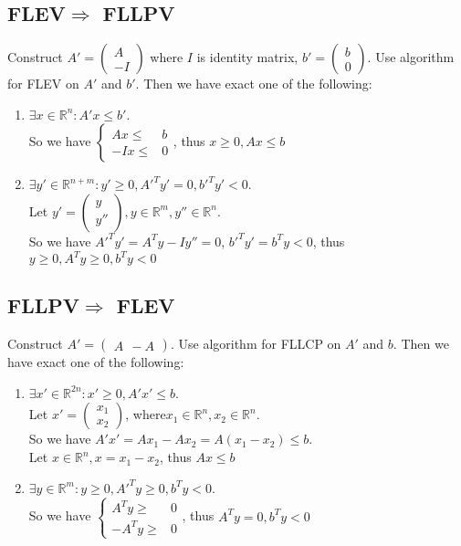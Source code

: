 	\subsection{FLEV$\Rightarrow$ FLLPV}
	Construct \boldmath $A'=
	\left(\begin{aligned}
	A\\ -I
	\end{aligned}\right)$ where $I$ is identity matrix, $b'=\left(\begin{aligned}
	b\\ 0
	\end{aligned}\right)$. Use algorithm for FLEV on $A'$ and $b'$. Then we have exact one of the following:
	\begin{enumerate}
		\item $\exists x\in \mathbb{R}^n:A'x\leq b'$.\\ So we have $\left\{\begin{aligned}
		Ax\leq& b\\
		-Ix\leq& 0
		\end{aligned}\right.$, thus $x\geq 0,Ax\leq b$
		\item $\exists y'\in \mathbb{R}^{n+m}:y'\geq 0,A'^Ty'= 0,b'^Ty'<0$.\\ Let $y'=\left(\begin{aligned}
		y\\y''
		\end{aligned}\right),y\in \mathbb{R}^m,y''\in \mathbb{R}^n$.\\ So we have $A'^Ty'=A^Ty-Iy''=0$, $b'^Ty'=b^Ty<0$, thus $y\geq0,A^Ty\geq 0,b^Ty<0$
	\end{enumerate}
	\subsection{FLLPV$\Rightarrow$ FLEV}
	Construct \boldmath $A'=
	\left(\begin{aligned}
	A\ \ -A
	\end{aligned}\right)$. Use algorithm for FLLCP on $A'$ and $b$. Then we have exact one of the following:
	\begin{enumerate}
		\item $\exists x'\in \mathbb{R}^{2n}:x'\geq 0,A'x'\leq b$.\\ Let $x'=\left(\begin{aligned}
		x_1\\ x_2
		\end{aligned}\right)$, where$x_1\in \mathbb{R}^n,x_2\in \mathbb{R}^n$.\\ So we have $A'x'=Ax_1-Ax_2=A(x_1-x_2)\leq b$. \\Let $x\in \mathbb{R}^n,x=x_1-x_2$, thus $Ax\leq b$
		\item $\exists y\in \mathbb{R}^m:y\geq 0,A'^Ty\geq 0,b^Ty<0$.\\ So we have $\left\{\begin{aligned}
		A^Ty\geq& 0\\
		-A^Ty\geq& 0
		\end{aligned}\right.$, thus $A^Ty=0,b^Ty<0$
	\end{enumerate}